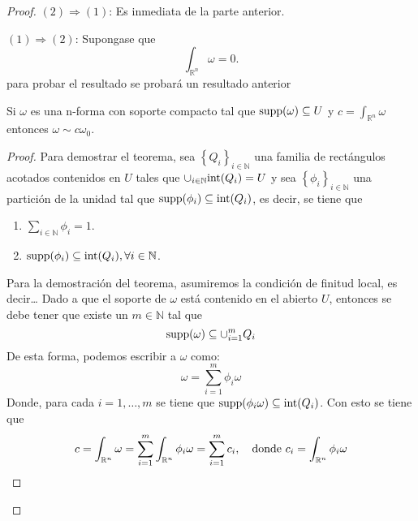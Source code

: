 \documentclass[12pt]{report}
\theoremstyle{largebreak}
\begin{document}
    \begin{proof}
        $(2)\Rightarrow(1)$: Es inmediata de la parte anterior.

        $(1)\Rightarrow(2)$: Supongase que
        \begin{equation*}
            \int_{\mathbb{R}^n}\omega = 0.
        \end{equation*}
        para probar el resultado se probará un resultado anterior
        \begin{theor}
            Si $\omega$ es una n-forma con soporte compacto tal que $\textup{supp}(\omega)\subseteq U$ y $c=\int_{\mathbb{R}^n}\omega$ entonces $\omega \sim c\omega_0$.
        \end{theor}
        \begin{proof}
            Para demostrar el teorema, sea $\left\{Q_i\right\}_{i\in\mathbb{N}}$ una familia de rectángulos acotados contenidos en $U$ tales que $\cup_{i\in\mathbb{N}}\textup{int}(Q_i)=U$ y sea $\left\{\phi_i\right\}_{i\in\mathbb{N}}$ una partición de la unidad tal que $\textup{supp}(\phi_i)\subseteq \textup{int}(Q_i)$, es decir, se tiene que
            \begin{enumerate}
                \item $\sum_{i\in\mathbb{N}}\phi_i=1$.
                \item $\textup{supp}(\phi_i)\subseteq \textup{int}(Q_i),\forall i\in\mathbb{N}$.
            \end{enumerate}
            Para la demostración del teorema, asumiremos la condición de finitud local, es decir\dots
            Dado a que el soporte de $\omega$ está contenido en el abierto $U$, entonces se debe tener que existe un $m\in\mathbb{N}$ tal que
            \begin{equation*}
                \textup{supp}(\omega)\subseteq\cup_{i=1}^{m}Q_i
            \end{equation*}
            De esta forma, podemos escribir a $\omega$ como:
            \begin{equation*}
                \omega = \sum_{i=1}^{m}\phi_i \omega
            \end{equation*}
            Donde, para cada $i=1,\dots,m$ se tiene que $\textup{supp}(\phi_i \omega)\subseteq \textup{int}(Q_i)$. Con esto se tiene que
            \begin{equation*}
                c=\int_{\mathbb{R}^n}\omega = \sum_{i=1}^{m}\int_{\mathbb{R}^n}\phi_i\omega=\sum_{i=1}^{m}c_i, \quad \textup{donde }c_i=\int_{\mathbb{R}^n}\phi_i\omega 
            \end{equation*}

\end{proof}
\end{proof}
\end{document}

